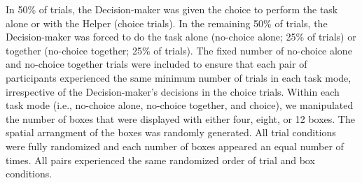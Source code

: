 \documentclass[
  man,
  floatsintext,
  longtable,
  nolmodern,
  notxfonts,
  notimes,
  colorlinks=true,linkcolor=blue,citecolor=blue,urlcolor=blue]{apa7}
\begin{document}
In 50\% of trials, the Decision-maker was given the choice to perform
the task alone or with the Helper (choice trials). In the remaining 50\%
of trials, the Decision-maker was forced to do the task alone (no-choice
alone; 25\% of trials) or together (no-choice together; 25\% of trials).
The fixed number of no-choice alone and no-choice together trials were
included to ensure that each pair of participants experienced the same
minimum number of trials in each task mode, irrespective of the
Decision-maker's decisions in the choice trials. Within each task mode
(i.e., no-choice alone, no-choice together, and choice), we manipulated
the number of boxes that were displayed with either four, eight, or 12
boxes. The spatial arrangment of the boxes was randomly generated. All
trial conditions were fully randomized and each number of boxes appeared
an equal number of times. All pairs experienced the same randomized
order of trial and box conditions.
\end{document}
